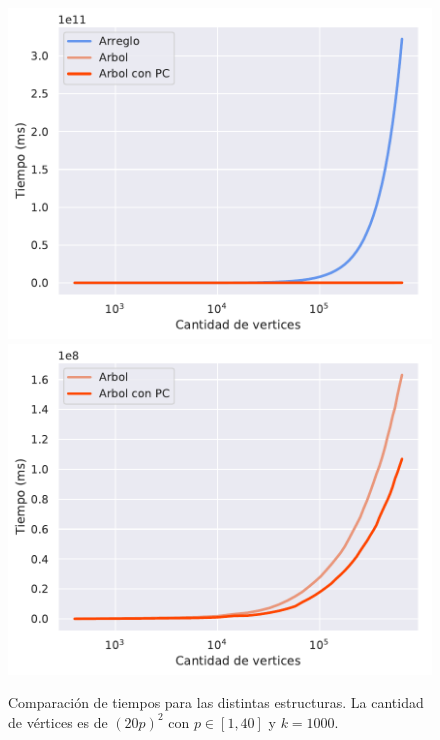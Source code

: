\begin{figure}[H]
\begin{center}
	\includegraphics[scale=0.5]{plots/compEstr.pdf}
	\includegraphics[scale=0.5]{plots/comp_arbs.pdf}
	\caption{Comparaci\'on de tiempos para las distintas estructuras. La cantidad de vértices es de $(20p)^2$ con $p\in[1,40]$ y $k=1000$.}
	\label{comp_estr}
\end{center}
\end{figure}
\vspace{-7mm}

